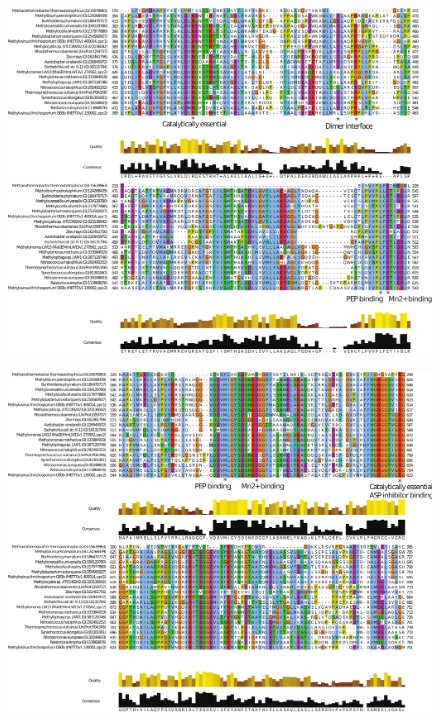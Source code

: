 \begin{figure}[H]
\centering
     \includegraphics[width=1.0\textwidth]{./tex/chapter1/figures/supplemental/FigureS6d.pdf}
\end{figure}

\begin{figure}[H]
\centering
     \includegraphics[width=1.0\textwidth]{./tex/chapter1/figures/supplemental/FigureS6e.pdf}
\end{figure}

